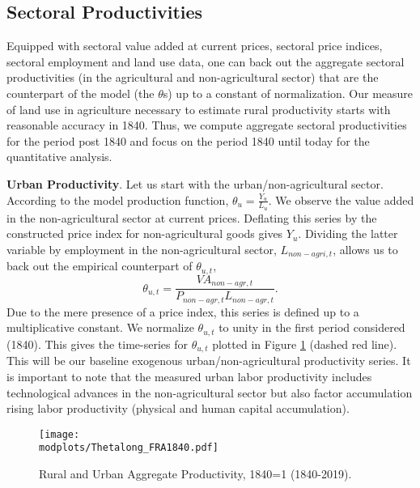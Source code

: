 \documentclass[11pt]{report}
\newcommand{\round}{revision3}  %
\newcommand{\modplots}{../../output/model/plots/\round}
\begin{document}
\subsection{Sectoral Productivities}\label{A-sec:sectoral-productivities}

Equipped with sectoral value added at current prices, sectoral price indices, sectoral employment and land use data, one can back out the aggregate sectoral productivities (in the agricultural and non-agricultural sector) that are the counterpart of the model (the $\theta$s) up to a constant of normalization. Our measure of land use in agriculture necessary to estimate rural productivity starts with reasonable accuracy in 1840. Thus, we compute aggregate sectoral productivities for the period post 1840 and focus on the period 1840 until today for the quantitative analysis.

\noindent \textbf{Urban Productivity}. Let us start with the urban/non-agricultural sector. According to the model production function, $\theta_u=\frac{Y_u}{L_u}$. We observe the value added in the non-agricultural sector at current prices. Deflating this series by the constructed price index for non-agricultural goods gives $Y_u$. Dividing the latter variable by employment in the non-agricultural sector, $L_{non-agri,t}$, allows us to back out the empirical counterpart of $\theta_{u,t}$,
\begin{equation*}
\theta_{u,t}=\frac{VA_{non-agr,t}}{P_{non-agr,t}L_{non-agr,t}}.
\end{equation*}
Due to the mere presence of a price index, this series is defined up to a multiplicative constant. We normalize $\theta_{u,t}$ to unity in the first period considered (1840). This gives the time-series for $\theta_{u,t}$ plotted in Figure \ref{A-fig:theta} (dashed red line). This will be our baseline exogenous urban/non-agricultural productivity series. It is important to note that the measured urban labor productivity includes technological advances in the non-agricultural sector but also factor accumulation rising labor productivity (physical and human capital accumulation). 

\begin{figure}
	\begin{center}
		\texttt{[image: \\modplots/Thetalong\_FRA1840.pdf]}
	\end{center}
	\vspace{-0.5cm}
	\caption{Rural and Urban Aggregate Productivity, 1840=1 (1840-2019).}
	\label{A-fig:theta}
\end{figure}
\end{document}
